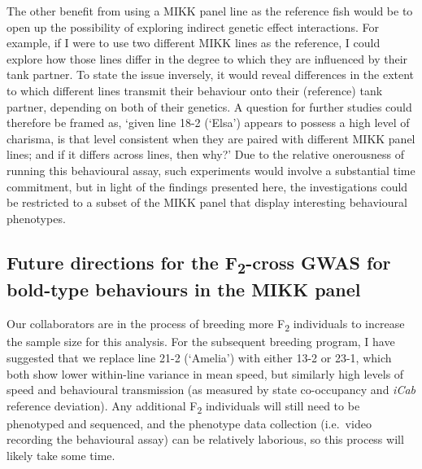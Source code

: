 \documentclass[
]{book}
\begin{document}
The other benefit from using a MIKK panel line as the reference fish would be to open up the possibility of exploring indirect genetic effect interactions. For example, if I were to use two different MIKK lines as the reference, I could explore how those lines differ in the degree to which they are influenced by their tank partner. To state the issue inversely, it would reveal differences in the extent to which different lines transmit their behaviour onto their (reference) tank partner, depending on both of their genetics. A question for further studies could therefore be framed as, `given line \textcolor{18-2 (‘Elsa’)_FF66A6}{18-2 (‘Elsa’)} appears to possess a high level of charisma, is that level consistent when they are paired with different MIKK panel lines; and if it differs across lines, then why?' Due to the relative onerousness of running this behavioural assay, such experiments would involve a substantial time commitment, but in light of the findings presented here, the investigations could be restricted to a subset of the MIKK panel that display interesting behavioural phenotypes.

\hypertarget{future-directions-for-the-f2-cross-gwas-for-bold-type-behaviours-in-the-mikk-panel}{%
\subsection{\texorpdfstring{Future directions for the F\textsubscript{2}-cross GWAS for bold-type behaviours in the MIKK panel}{Future directions for the F2-cross GWAS for bold-type behaviours in the MIKK panel}}\label{future-directions-for-the-f2-cross-gwas-for-bold-type-behaviours-in-the-mikk-panel}}

Our collaborators are in the process of breeding more F\textsubscript{2} individuals to increase the sample size for this analysis. For the subsequent breeding program, I have suggested that we replace line \textcolor{21-2 (‘Amelia’)_49B500}{21-2 (‘Amelia’)} with either \textcolor{13-2_F57A5F}{13-2} or \textcolor{23-1_AFA200}{23-1}, which both show lower within-line variance in mean speed, but similarly high levels of speed and behavioural transmission (as measured by state co-occupancy and \emph{\textcolor{iCab_424B4D}{iCab}} reference deviation). Any additional F\textsubscript{2} individuals will still need to be phenotyped and sequenced, and the phenotype data collection (i.e.~video recording the behavioural assay) can be relatively laborious, so this process will likely take some time.
\end{document}
